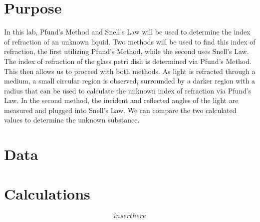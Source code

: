 \documentclass[12pt]{article}
\begin{document}

\newpage
\tableofcontents
\newpage
\section{Purpose}
In this lab, Pfund's Method and Snell's Law will be used to determine the index of refraction of an unknown liquid. 
Two methods will be used to find this index of refraction, the first utilizing Pfund's Method, while the second uses Snell's Law.
The index of refraction of the glass petri dish is determined via Pfund's Method. This then allows us to proceed with both methods. 
As light is refracted through a medium, a small circular region is observed, surrounded by a darker region with a radius that can be used to calculate the unknown index of refraction via Pfund's Law.
In the second method, the incident and reflected angles of the light are measured and plugged into Snell's Law. We can compare the two calculated values to determine the unknown substance.
\newpage
\section{Data}

\newpage
\section{Calculations}
\[insert here\]
\end{document}
